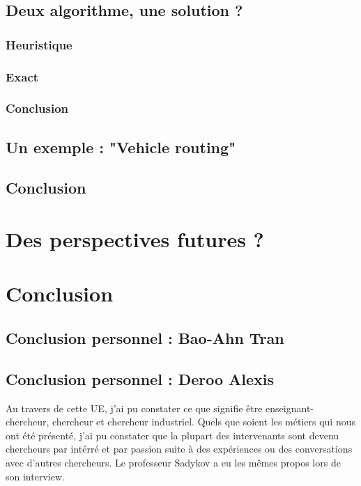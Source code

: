 \documentclass[12pt]{article}
\begin{document}
    \subsection{Deux algorithme, une solution ?}\label{subsec:deux-algorithme,-une-solution-?}
    \subsubsection{Heuristique}
    \subsubsection{Exact}
    \subsubsection{Conclusion}
    \subsection{Un exemple : "Vehicle routing"}\label{subsec:un-exemple-:-"vehicle-routing"}
    \subsection{Conclusion}\label{subsec:conclusion}

    \section{Des perspectives futures ?}\label{sec:des-perspectives-futures-?}


    \section{Conclusion}\label{sec:conclusion}
    \subsection{Conclusion personnel : Bao-Ahn Tran}\label{subsec:conclusion-personnel-:-bao-ahn-tran}

    \newpage
    \subsection{Conclusion personnel : Deroo Alexis}\label{subsec:conclusion-personnel-:-deroo-alexis}
    Au travers de cette UE, j'ai pu constater ce que signifie être enseignant-chercheur, chercheur et chercheur
    industriel. Quels que soient les métiers qui nous ont été présenté, j'ai pu constater que la plupart des
    intervenants sont devenu chercheurs par intérré et par passion suite à des expériences ou des conversations avec
    d'autres chercheurs. Le professeur Sadykov a eu les mêmes propos lors de son interview.
\end{document}
